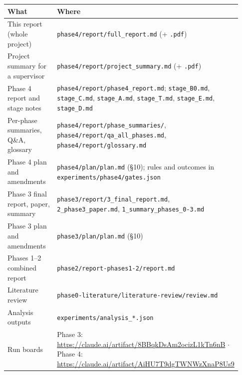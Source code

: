 \documentclass[11pt]{article}
\begin{document}
\begin{center}\small\begin{tabular}{>{\raggedright\arraybackslash}p{0.277\linewidth}>{\raggedright\arraybackslash}p{0.657\linewidth}}
\toprule
What & Where \\
\midrule
This report (whole project) & \texttt{phase4/\allowbreak{}report/\allowbreak{}full\_\allowbreak{}report.\allowbreak{}md} (+ \texttt{.pdf}) \\
Project summary for a supervisor & \texttt{phase4/\allowbreak{}report/\allowbreak{}project\_\allowbreak{}summary.\allowbreak{}md} (+ \texttt{.pdf}) \\
Phase 4 report and stage notes & \texttt{phase4/\allowbreak{}report/\allowbreak{}phase4\_\allowbreak{}report.\allowbreak{}md}; \texttt{stage\_B0.md}, \texttt{stage\_C.md}, \texttt{stage\_A.md}, \texttt{stage\_T.md}, \texttt{stage\_E.md}, \texttt{stage\_D.md} \\
Per-phase summaries, Q\&A, glossary & \texttt{phase4/\allowbreak{}report/\allowbreak{}phase\_\allowbreak{}summaries/\allowbreak{}}, \texttt{phase4/\allowbreak{}report/\allowbreak{}qa\_\allowbreak{}all\_\allowbreak{}phases.\allowbreak{}md}, \texttt{phase4/\allowbreak{}report/\allowbreak{}glossary.\allowbreak{}md} \\
Phase 4 plan and amendments & \texttt{phase4/\allowbreak{}plan/\allowbreak{}plan.\allowbreak{}md} (\S{}10); rules and outcomes in \texttt{experiments/\allowbreak{}phase4/\allowbreak{}gates.\allowbreak{}json} \\
Phase 3 final report, paper, summary & \texttt{phase3/\allowbreak{}report/\allowbreak{}3\_\allowbreak{}final\_\allowbreak{}report.\allowbreak{}md}, \texttt{2\_\allowbreak{}phase3\_\allowbreak{}paper.\allowbreak{}md}, \texttt{1\_\allowbreak{}summary\_\allowbreak{}phases\_\allowbreak{}0-3.\allowbreak{}md} \\
Phase 3 plan and amendments & \texttt{phase3/\allowbreak{}plan/\allowbreak{}plan.\allowbreak{}md} (\S{}10) \\
Phases 1--2 combined report & \texttt{phase2/\allowbreak{}report-phases1-2/\allowbreak{}report.\allowbreak{}md} \\
Literature review & \texttt{phase0-literature/\allowbreak{}literature-review/\allowbreak{}review.\allowbreak{}md} \\
Analysis outputs & \texttt{experiments/\allowbreak{}analysis\_\allowbreak{}*.\allowbreak{}json} \\
Run boards & Phase 3: \url{https://claude.ai/artifact/8BBqkDsAm2ocizL1kTn6nB} $\cdot$ Phase 4: \url{https://claude.ai/artifact/AiHU7T9dgTWNWzXnaP8Us9} \\
\bottomrule
\end{tabular}\end{center}
\end{document}
